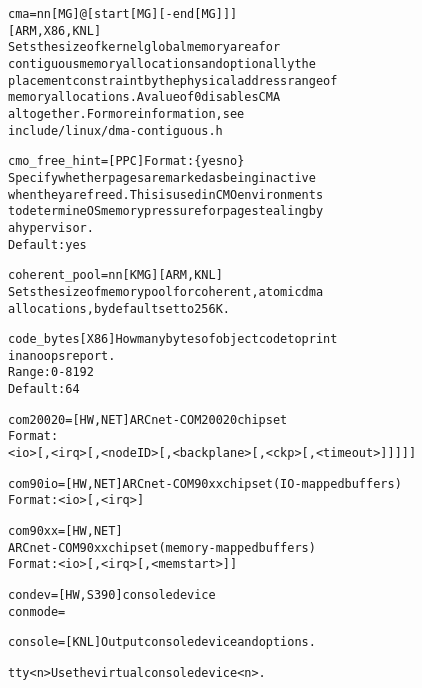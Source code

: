 \documentclass[a4paper,8pt,english]{sphinxmanual}
\begin{document}
\begin{alltt}
        cma=nn{[}MG{]}@{[}start{[}MG{]}{[}-end{[}MG{]}{]}{]}
                        {[}ARM,X86,KNL{]}
                        Sets the size of kernel global memory area for
                        contiguous memory allocations and optionally the
                        placement constraint by the physical address range of
                        memory allocations. A value of 0 disables CMA
                        altogether. For more information, see
                        include/linux/dma-contiguous.h

        cmo\_free\_hint=  {[}PPC{]} Format: \{ yes \textbar{} no \}
                        Specify whether pages are marked as being inactive
                        when they are freed.  This is used in CMO environments
                        to determine OS memory pressure for page stealing by
                        a hypervisor.
                        Default: yes

        coherent\_pool=nn{[}KMG{]}   {[}ARM,KNL{]}
                        Sets the size of memory pool for coherent, atomic dma
                        allocations, by default set to 256K.

        code\_bytes      {[}X86{]} How many bytes of object code to print
                        in an oops report.
                        Range: 0 - 8192
                        Default: 64

        com20020=       {[}HW,NET{]} ARCnet - COM20020 chipset
                        Format:
                        \textless{}io\textgreater{}{[},\textless{}irq\textgreater{}{[},\textless{}nodeID\textgreater{}{[},\textless{}backplane\textgreater{}{[},\textless{}ckp\textgreater{}{[},\textless{}timeout\textgreater{}{]}{]}{]}{]}{]}

        com90io=        {[}HW,NET{]} ARCnet - COM90xx chipset (IO-mapped buffers)
                        Format: \textless{}io\textgreater{}{[},\textless{}irq\textgreater{}{]}

        com90xx=        {[}HW,NET{]}
                        ARCnet - COM90xx chipset (memory-mapped buffers)
                        Format: \textless{}io\textgreater{}{[},\textless{}irq\textgreater{}{[},\textless{}memstart\textgreater{}{]}{]}

        condev=         {[}HW,S390{]} console device
        conmode=

        console=        {[}KNL{]} Output console device and options.

                tty\textless{}n\textgreater{}  Use the virtual console device \textless{}n\textgreater{}.


\end{alltt}
\end{document}
